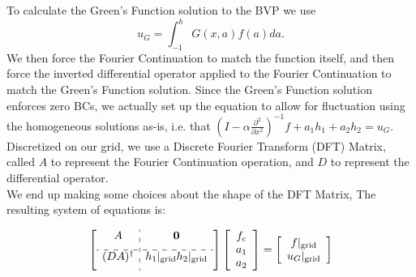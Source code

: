 \documentclass[11pt]{amsart}
\begin{document}
To calculate the Green's Function solution to the BVP we use
\begin{equation}
u_G=\int_{-1}^b G(x,a)f(a)da.
\end{equation}
We then force the Fourier Continuation to match the function itself, and then force the inverted differential operator applied to the Fourier Continuation to match the Green's Function solution.  Since the Green's Function solution enforces zero BCs, we actually set up the equation to allow for fluctuation using the homogeneous solutions as-is, i.e. that  $(I-\alpha \frac{\partial^2}{\partial x^2})^{-1}f + a_1 h_1 + a_2 h_2 = u_G$. \\
Discretized on our grid, we use a Discrete Fourier Transform (DFT) Matrix, called $A$ to represent the Fourier Continuation operation, and $D$ to represent the differential operator.  \\
We end up making some choices about the shape of the DFT Matrix, The resulting system of equations is: 


\begin{equation}
\left[
\begin{array}{c:c}
A &  \mathbf{0} \\[6pt] \hdashline
(DA)^{\dagger} & h_1|_{\text{grid}} h_2|_{\text{grid}} \\[6pt]
\end{array} \right] 
\left[ 
\begin{array}{c}
f_c \\
a_1\\
a_2
\end{array}
\right]
= 
\left[ 
\begin{array}{c}
f|_{\text{grid}}\\
u_G|_{\text{grid}}
\end{array}
\right]
\end{equation}
\end{document}

